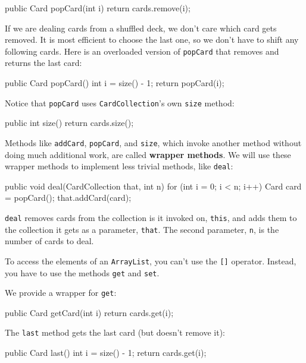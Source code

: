 \documentclass[12pt]{book}
\theoremstyle{exercise}
\newcommand{\java}[1]{\verb"#1"}
\begin{document}
\begin{code}
    public Card popCard(int i) {
        return cards.remove(i);
    }
\end{code}

If we are dealing cards from a shuffled deck, we don't care which card gets removed.
It is most efficient to choose the last one, so we don't have to shift any following cards.
Here is an overloaded version of \java{popCard} that removes and returns the last card:

\begin{code}
    public Card popCard() {
        int i = size() - 1;
        return popCard(i);
    }
\end{code}

Notice that \java{popCard} uses \java{CardCollection}'s own \java{size} method:

\begin{code}
    public int size() {
        return cards.size();
    }
\end{code}

Methods like \java{addCard}, \java{popCard}, and \java{size}, which invoke another method without doing much additional work, are called {\bf wrapper methods}.
We will use these wrapper methods to implement less trivial methods, like \java{deal}:

\begin{code}
    public void deal(CardCollection that, int n) {
        for (int i = 0; i < n; i++) {
            Card card = popCard();
            that.addCard(card);
        }
    }
\end{code}

\java{deal} removes cards from the collection is it invoked on, \java{this}, and adds them to the collection it gets as a parameter, \java{that}.
The second parameter, \java{n}, is the number of cards to deal.

To access the elements of an \java{ArrayList}, you can't use the \java{[]} operator.
Instead, you have to use the methods \java{get} and \java{set}.

We provide a wrapper for \java{get}:

\begin{code}
    public Card getCard(int i) {
        return cards.get(i);
    }
\end{code}

The \java{last} method gets the last card (but doesn't remove it):

\begin{code}
    public Card last() {
        int i = size() - 1;
        return cards.get(i);
    }
\end{code}
\end{document}
